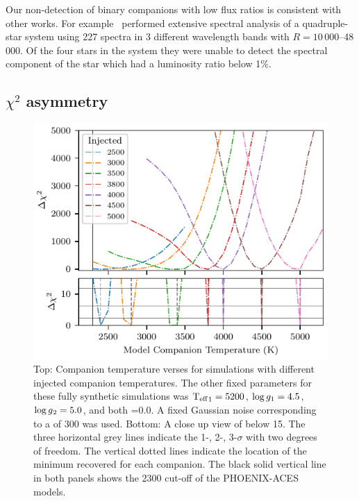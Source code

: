 Our non-detection of binary companions with low flux ratios is consistent with other works.
For example~\citet{nemravova_xtauri_2016} performed extensive spectral analysis of a quadruple-star system  using 227 spectra in 3 different wavelength bands with \(R=10\,000\)--48\,000.
Of the four stars in the system they were unable to detect the spectral component of the star which had a luminosity ratio below 1\%.



\subsection{\(\chi^2\) asymmetry}
\label{subsec:chi2_assymetry}

\begin{figure}
    \centering
    \includegraphics[width=0.8\linewidth]{figures/companion_recovery/chi2_shape_investigation_with_delta}
    \caption[Shape of simulated \textchisquared{} with different injected companion temperatures.]{Top: Companion temperature verses \textchisquared{} for simulations with different injected companion temperatures.
        The other fixed parameters for these fully synthetic simulations was \({\textrm{T}_{\mathrm{eff}}}_{1}=5200\)\K{}, \(\log{g}_{1}=4.5\), \(\log{g}{}_{2}=5.0\), and both \feh{}=0.0.
        A fixed Gaussian noise corresponding to a \snr{} of 300 was used.
        Bottom: A close up view of \textchisquared{} below 15.
        The three horizontal grey lines indicate the 1-, 2-, 3-$\sigma$ with two degrees of freedom.
        The vertical dotted lines indicate the location of the minimum \textchisquared{} recovered for each companion.
        The black solid vertical line in both panels shows the 2300\K{} cut-off of the {PHOENIX-ACES} models.}
    \label{fig:injection_shape}
\end{figure}

